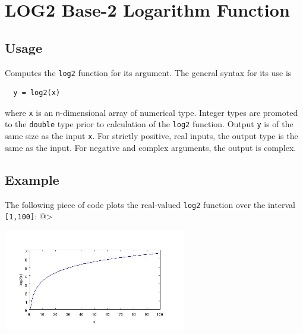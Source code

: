 \section{LOG2 Base-2 Logarithm Function}

\subsection{Usage}

Computes the \verb|log2| function for its argument.  The general
syntax for its use is
\begin{verbatim}
  y = log2(x)
\end{verbatim}
where \verb|x| is an \verb|n|-dimensional array of numerical type.
Integer types are promoted to the \verb|double| type prior to
calculation of the \verb|log2| function.  Output \verb|y| is of the
same size as the input \verb|x|. For strictly positive, real inputs, 
the output type is the same as the input.
For negative and complex arguments, the output is complex.
\subsection{Example}

The following piece of code plots the real-valued \verb|log2|
function over the interval \verb|[1,100]|:
@>


\centerline{\includegraphics[width=8cm]{log2plot}}

